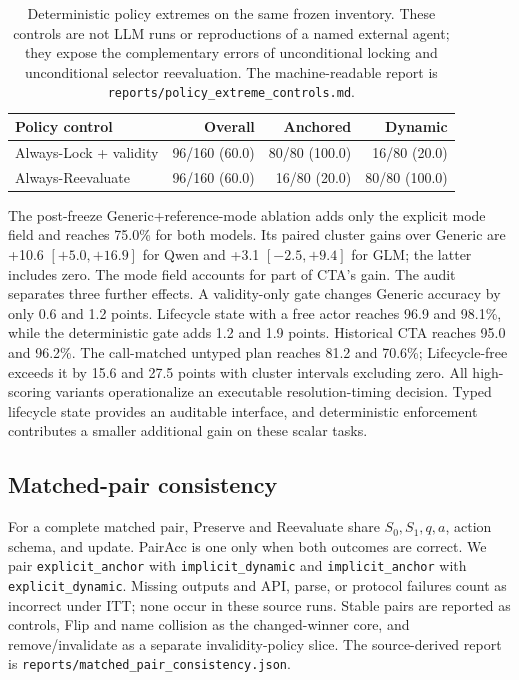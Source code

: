 \documentclass[10pt]{article}
\begin{document}
\begin{table}[h]
\centering
\small
\begin{tabular}{lrrr}
\toprule
Policy control & Overall & Anchored & Dynamic \\
\midrule
Always-Lock + validity & 96/160 (60.0) & 80/80 (100.0) & 16/80 (20.0) \\
Always-Reevaluate & 96/160 (60.0) & 16/80 (20.0) & 80/80 (100.0) \\
\bottomrule
\end{tabular}
\caption{Deterministic policy extremes on the same frozen inventory. These controls are not
LLM runs or reproductions of a named external agent; they expose the complementary errors of
unconditional locking and unconditional selector reevaluation. The machine-readable report
is \texttt{reports/policy\_extreme\_controls.md}.}
\end{table}

The post-freeze Generic+reference-mode ablation adds only the explicit mode field and reaches
75.0\% for both models. Its paired cluster gains over Generic are +10.6
$[+5.0,+16.9]$ for Qwen and +3.1 $[-2.5,+9.4]$ for GLM; the latter includes zero. The
mode field accounts for part of CTA's gain. The audit separates three further effects. A validity-only gate changes Generic accuracy by only
0.6 and 1.2 points. Lifecycle state with a free actor reaches 96.9 and 98.1\%, while the
deterministic gate adds 1.2 and 1.9 points. Historical CTA reaches 95.0 and 96.2\%.
The call-matched untyped plan reaches 81.2 and 70.6\%; Lifecycle-free exceeds it by 15.6 and
27.5 points with cluster intervals excluding zero. All high-scoring variants operationalize an
executable resolution-timing decision. Typed lifecycle state provides an auditable interface, and
deterministic enforcement contributes a smaller additional gain on these scalar tasks.

\subsection{Matched-pair consistency}
For a complete matched pair, Preserve and Reevaluate share $S_0,S_1,q,a$, action schema, and
update. PairAcc is one only when both outcomes are correct. We pair
\texttt{explicit\_anchor} with \texttt{implicit\_dynamic} and
\texttt{implicit\_anchor} with \texttt{explicit\_dynamic}. Missing outputs and API, parse, or
protocol failures count as incorrect under ITT; none occur in these source runs. Stable pairs are
reported as controls, Flip and name collision as the changed-winner core, and remove/invalidate
as a separate invalidity-policy slice. The source-derived report is
\texttt{reports/matched\_pair\_consistency.json}.
\end{document}
